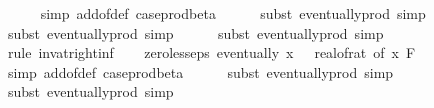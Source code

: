 \begin{isabellebody}
\ \ \ \ \isamarkupfalse%
\ {\isacharparenleft}{\kern0pt}simp\ add{\isacharcolon}{\kern0pt}{\isasymdelta}{\isacharunderscore}{\kern0pt}of{\isacharunderscore}{\kern0pt}def\ case{\isacharunderscore}{\kern0pt}prod{\isacharunderscore}{\kern0pt}beta{\isacharprime}{\kern0pt}{\isacharparenright}{\kern0pt}\isanewline
\ \ \ \ \isamarkupfalse%
\ {\isacharparenleft}{\kern0pt}subst\ eventually{\isacharunderscore}{\kern0pt}prod{}{\isacharprime}{\kern0pt}{\isacharcomma}{\kern0pt}\ simp{\isacharparenright}{\kern0pt}\isanewline
\ \ \ \ \isamarkupfalse%
\ {\isacharparenleft}{\kern0pt}subst\ eventually{\isacharunderscore}{\kern0pt}prod{}{\isacharprime}{\kern0pt}{\isacharcomma}{\kern0pt}\ simp{\isacharparenright}{\kern0pt}\isanewline
\ \ \ \ \isamarkupfalse%
\ {\isacharparenleft}{\kern0pt}subst\ eventually{\isacharunderscore}{\kern0pt}prod{}{\isacharprime}{\kern0pt}{\isacharcomma}{\kern0pt}\ simp{\isacharparenright}{\kern0pt}\isanewline
\ \ \ \ \isamarkupfalse%
\ {\isacharparenleft}{\kern0pt}rule\ inv{\isacharunderscore}{\kern0pt}at{\isacharunderscore}{\kern0pt}right{\isacharunderscore}{\kern0pt}{}{\isacharunderscore}{\kern0pt}inf{\isacharparenright}{\kern0pt}\isanewline
\isanewline
\ \ \isamarkupfalse%
\ zero{\isacharunderscore}{\kern0pt}less{\isacharunderscore}{\kern0pt}eps{\isacharcolon}{\kern0pt}\ {\isachardoublequoteopen}eventually\ {\isacharparenleft}{\kern0pt}{\isasymlambda}x{\isachardot}{\kern0pt}\ {}\ {\isacharless}{\kern0pt}\ {\isacharparenleft}{\kern0pt}real{\isacharunderscore}{\kern0pt}of{\isacharunderscore}{\kern0pt}rat\ {\isacharparenleft}{\kern0pt}{\isasymepsilon}{\isacharunderscore}{\kern0pt}of\ x{\isacharparenright}{\kern0pt}{\isacharparenright}{\kern0pt}{\isacharparenright}{\kern0pt}\ {\isacharquery}{\kern0pt}F{\isachardoublequoteclose}\isanewline
\ \ \ \ \isamarkupfalse%
\ {\isacharparenleft}{\kern0pt}simp\ add{\isacharcolon}{\kern0pt}{\isasymepsilon}{\isacharunderscore}{\kern0pt}of{\isacharunderscore}{\kern0pt}def\ case{\isacharunderscore}{\kern0pt}prod{\isacharunderscore}{\kern0pt}beta{\isacharprime}{\kern0pt}{\isacharparenright}{\kern0pt}\isanewline
\ \ \ \ \isamarkupfalse%
\ {\isacharparenleft}{\kern0pt}subst\ eventually{\isacharunderscore}{\kern0pt}prod{}{\isacharprime}{\kern0pt}{\isacharcomma}{\kern0pt}\ simp{\isacharparenright}{\kern0pt}\isanewline
\ \ \ \ \isamarkupfalse%
\ {\isacharparenleft}{\kern0pt}subst\ eventually{\isacharunderscore}{\kern0pt}prod{}{\isacharprime}{\kern0pt}{\isacharcomma}{\kern0pt}\ simp{\isacharparenright}{\kern0pt}\isanewline

\end{isabellebody}
